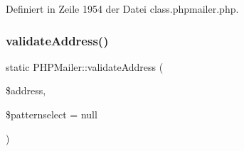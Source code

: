 Definiert in Zeile 1954 der Datei class.\+phpmailer.\+php.

\mbox{\label{class_p_h_p_mailer_ab8ded1ff8bd8d47c4a3300851cba88b4}} 
\subsubsection{\texorpdfstring{validate\+Address()}{validateAddress()}}
{\footnotesize\ttfamily static P\+H\+P\+Mailer\+::validate\+Address (\begin{DoxyParamCaption}\item[{}]{\$address,  }\item[{}]{\$patternselect = {\ttfamily null} }\end{DoxyParamCaption})\hspace{0.3cm}{\ttfamily [static]}}

